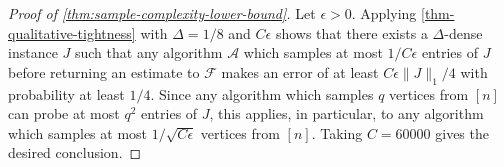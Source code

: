 \documentclass[final, 12pt]{colt2018}
\newcommand{\F}{\mathcal{F}}
\theoremstyle{definition}
\theoremstyle{plain}
\begin{document}
\begin{proof}[Proof of \cref{thm:sample-complexity-lower-bound}] Let $\epsilon > 0$. Applying \cref{thm-qualitative-tightness} with $\Delta = 1/8$ and $C\epsilon$ shows that there exists a $\Delta$-dense instance $J$ such that any algorithm $\mathcal{A}$ which samples at most $1/C\epsilon$ entries of $J$ before returning an estimate to $\F$ makes an error of at least $C\epsilon \|J\|_{1}/4$ with probability at least $1/4$. Since any algorithm which samples $q$ vertices from $[n]$ can probe at most $q^{2}$ entries of $J$, this applies, in particular, to any algorithm which samples at most $1/\sqrt{C\epsilon}$ vertices from $[n]$. Taking $C=60000$ gives the desired conclusion. 
\end{proof}
\end{document}
